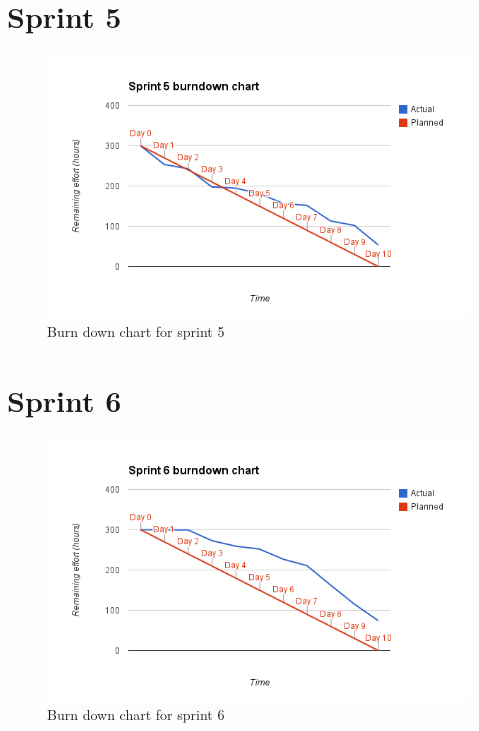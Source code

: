 \section{Sprint 5}
\begin{figure}[H]
\includegraphics[width=\textwidth]{appendix/backlog/burndown5.png}
\caption{Burn down chart for sprint 5}
\end{figure}


\section{Sprint 6}
\begin{figure}[H]
\includegraphics[width=\textwidth]{appendix/backlog/burndown6.png}
\caption{Burn down chart for sprint 6}
\end{figure}


